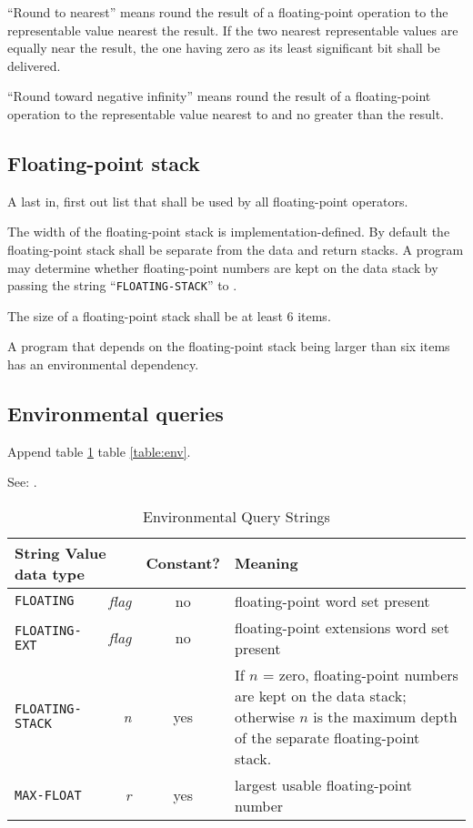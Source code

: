 ``Round to nearest'' means round the result of a floating-point
operation to the representable value nearest the result. If the two
nearest representable values are equally near the result, the one
having zero as its least significant bit shall be delivered.

``Round toward negative infinity'' means round the result of a
floating-point operation to the representable value nearest to and
no greater than the result.

\subsection{Floating-point stack} %
\label{float:stack}

A last in, first out list that shall be used by all floating-point
operators.

The width of the floating-point stack is implementation-defined. By
default the floating-point stack shall be separate from the data and
return stacks. A program may determine whether floating-point numbers
are kept on the data stack by passing the string
``\texttt{FLOATING-STACK}'' to .

The size of a floating-point stack shall be at least 6 items.

A program that depends on the floating-point stack being larger than
six items has an environmental dependency.

\subsection{Environmental queries} %

Append table \ref{float:env} table \ref{table:env}.

See: .

\begin{table}[ht]
  \begin{center}
	\caption{Environmental Query Strings}
	\label{float:env}
	\begin{tabular}{p{9em}rcp{}}
		\hline\hline
		\multicolumn{2}{l}{String \hfill Value data type} & Constant? & Meaning \\
		\hline
		\texttt{FLOATING}		& \emph{flag}		& no	&
			floating-point word set present \\
		\texttt{FLOATING-EXT}	& \emph{flag}		& no	&
			floating-point extensions word set present \\
		\texttt{FLOATING-STACK}	& \emph{n}			& yes	&
			If $n$ = zero, floating-point numbers are kept on the data stack;
			otherwise $n$ is the maximum depth of the separate floating-point stack. \\
		\texttt{MAX-FLOAT}		& \emph{r}			& yes	&
			largest usable floating-point number \\
		\hline\hline
	\end{tabular}
  \end{center}
\end{table}


